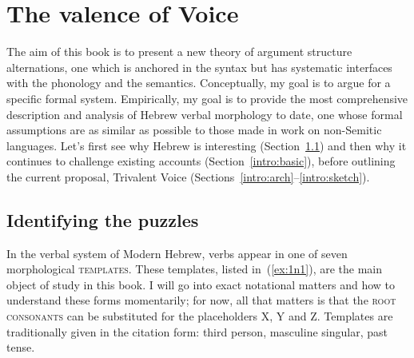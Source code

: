 \chapter{The valence of Voice}
\label{chap:intro}

The aim of this book is to present a new theory of argument structure alternations, one which is anchored in the syntax but has systematic interfaces with the phonology and the semantics. Conceptually, my goal is to argue for a specific formal system. Empirically, my goal is to provide the most comprehensive description and analysis of Hebrew verbal morphology to date, one whose formal assumptions are as similar as possible to those made in work on non-Semitic languages. Let's first see why Hebrew is interesting (Section~\ref{intro:puzzles}) and then why it continues to challenge existing accounts (Section~\ref{intro:basic}), before outlining the current proposal, Trivalent Voice (Sections~\ref{intro:arch}--\ref{intro:sketch}).

\section{Identifying the puzzles} \label{intro:puzzles}
In the verbal system of Modern Hebrew, verbs appear in one of seven morphological \textsc{templates}. These templates, listed in~(\ref{ex:1n1}), are the main object of study in this book. I will go into exact notational matters and how to understand these forms momentarily; for now, all that matters is that the \textsc{root consonants} can be substituted for the placeholders X, Y and Z. Templates are traditionally given in the citation form: third person, masculine singular, past tense.

